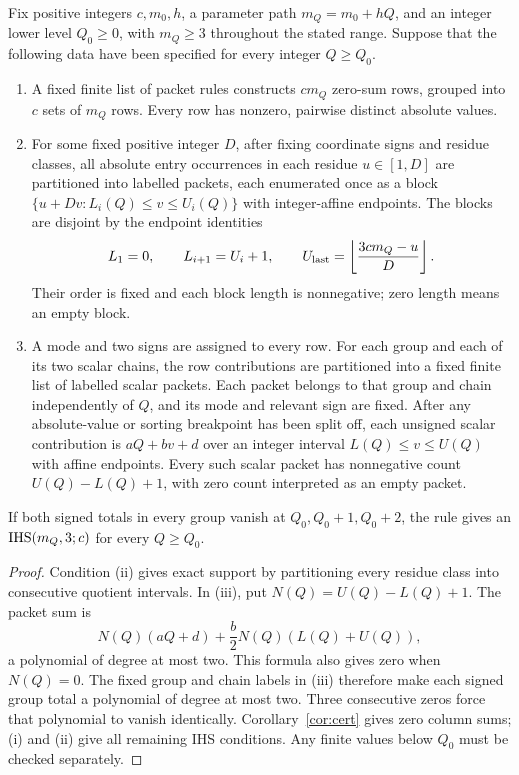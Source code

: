 \begin{lemma}\label{lem:certificate-transport}
Fix positive integers $c,m_0,h$, a parameter path $m_Q=m_0+hQ$, and an integer lower level $Q_0\ge0$,
with $m_Q\ge3$ throughout the stated range.
Suppose that the following data have been specified for every integer $Q\ge Q_0$.
\begin{enumerate}[label=\textup{(\roman*)}]
\item A fixed finite list of packet rules constructs $cm_Q$ zero-sum rows,
      grouped into $c$ sets of $m_Q$ rows.  Every row has nonzero, pairwise distinct absolute values.
\item For some fixed positive integer $D$, after fixing coordinate signs and residue classes,
      all absolute entry occurrences in each residue $u\in[1,D]$ are partitioned into labelled packets,
      each enumerated once as a block
      $\{u+Dv:L_i(Q)\le v\le U_i(Q)\}$ with integer-affine endpoints.
      The blocks are disjoint by the endpoint identities
      \[
       L_1=0,\qquad L_{i+1}=U_i+1,\qquad
       U_{\rm last}=\left\lfloor\frac{3cm_Q-u}{D}\right\rfloor.
      \]
      Their order is fixed and each block length is nonnegative; zero length means an empty block.
\item A mode and two signs are assigned to every row. For each group and each of its two
      scalar chains, the row contributions are partitioned into a fixed finite list of labelled
      scalar packets. Each packet belongs to that group and chain independently of $Q$, and
      its mode and relevant sign are fixed. After any absolute-value or sorting breakpoint has
      been split off, each unsigned scalar contribution is
      $aQ+bv+d$ over an integer interval $L(Q)\le v\le U(Q)$ with affine endpoints.
      Every such scalar packet has nonnegative count $U(Q)-L(Q)+1$, with zero count
      interpreted as an empty packet.
\end{enumerate}
If both signed totals in every group vanish at $Q_0,Q_0+1,Q_0+2$, the rule gives an
$\mathrm{IHS}(m_Q,3;c)$ for every $Q\ge Q_0$.
\end{lemma}
\begin{proof}
Condition \textup{(ii)} gives exact support by partitioning every residue class into consecutive
quotient intervals.  In \textup{(iii)}, put $N(Q)=U(Q)-L(Q)+1$.  The packet sum is
\[
 N(Q)(aQ+d)+\frac b2N(Q)(L(Q)+U(Q)),
\]
a polynomial of degree at most two.  This formula also gives zero when $N(Q)=0$.
The fixed group and chain labels in \textup{(iii)} therefore make each signed group total
a polynomial of degree at most two. Three consecutive zeros force that polynomial to vanish identically.
Corollary~\ref{cor:cert} gives zero column sums; \textup{(i)} and \textup{(ii)} give all remaining
IHS conditions.  Any finite values below $Q_0$ must be checked separately.
\end{proof}

